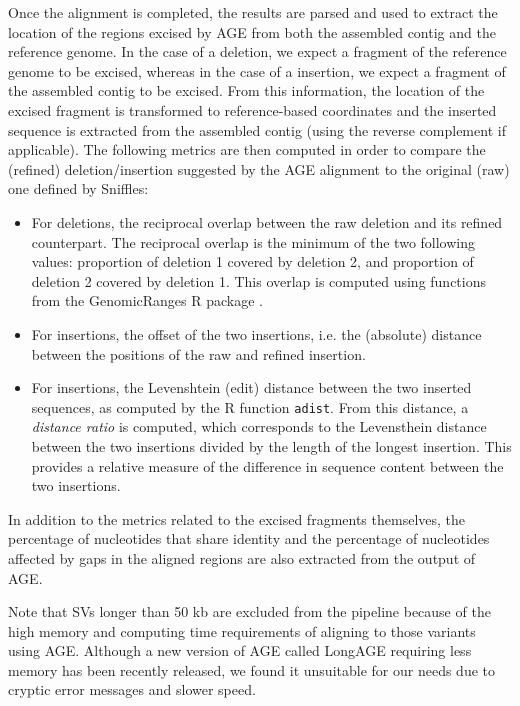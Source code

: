 \documentclass[12pt]{article}
\begin{document}
Once the alignment is completed, the results are parsed and used to extract the location of the regions excised by AGE from both the assembled contig and the reference genome.
In the case of a deletion, we expect a fragment of the reference genome to be excised, whereas in the case of a insertion, we expect a fragment of the assembled contig to be excised.
From this information, the location of the excised fragment is transformed to reference-based coordinates and the inserted sequence is extracted from the assembled contig (using the reverse complement if applicable).
The following metrics are then computed in order to compare the (refined) deletion/insertion suggested by the AGE alignment to the original (raw) one defined by Sniffles:

\begin{itemize}
	\item For deletions, the reciprocal overlap between the raw deletion and its refined counterpart. The reciprocal overlap is the minimum of the two following values: proportion of deletion 1 covered by deletion 2, and proportion of deletion 2 covered by deletion 1. This overlap is computed using functions from the GenomicRanges R package \citep{granges}.
	\item For insertions, the offset of the two insertions, i.e. the (absolute) distance between the positions of the raw and refined insertion.
	\item For insertions, the Levenshtein (edit) distance between the two inserted sequences, as computed by the R function \texttt{adist}. From this distance, a {\em distance ratio} is computed, which corresponds to the Levensthein distance between the two insertions divided by the length of the longest insertion. This provides a relative measure of the difference in sequence content between the two insertions.
\end{itemize}

In addition to the metrics related to the excised fragments themselves, the percentage of nucleotides that share identity and the percentage of nucleotides affected by gaps in the aligned regions are also extracted from the output of AGE.

Note that SVs longer than 50 kb are excluded from the pipeline because of the high memory and computing time requirements of aligning to those variants using AGE.
Although a new version of AGE called LongAGE \citep{longage} requiring less memory has been recently released, we found it unsuitable for our needs due to cryptic error messages and slower speed.
\end{document}

